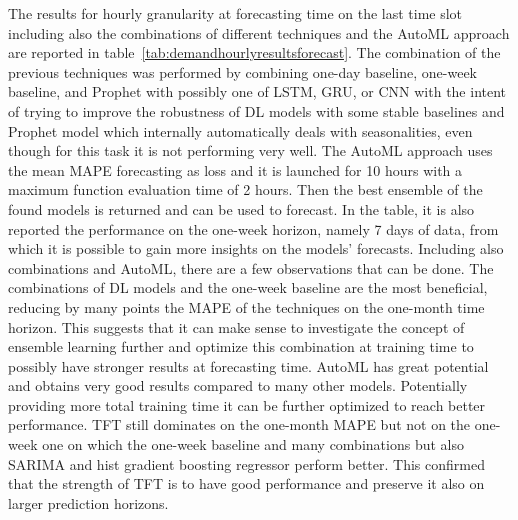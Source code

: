 The results for hourly granularity at forecasting time on the last time slot including also the combinations of different techniques and the AutoML approach are reported in table~\ref{tab:demandhourlyresultsforecast}.
The combination of the previous techniques was performed by combining one-day baseline, one-week baseline, and Prophet with possibly one of LSTM, GRU, or CNN with the intent of trying to improve the robustness of DL models with some stable baselines and Prophet model which internally automatically deals with seasonalities, even though for this task it is not performing very well.
The AutoML approach uses the mean MAPE forecasting as loss and it is launched for 10 hours with a maximum function evaluation time of 2 hours.
Then the best ensemble of the found models is returned and can be used to forecast.
In the table, it is also reported the performance on the one-week horizon, namely 7 days of data, from which it is possible to gain more insights on the models' forecasts.
Including also combinations and AutoML, there are a few observations that can be done.
The combinations of DL models and the one-week baseline are the most beneficial, reducing by many points the MAPE of the techniques on the one-month time horizon.
This suggests that it can make sense to investigate the concept of ensemble learning further and optimize this combination at training time to possibly have stronger results at forecasting time.
AutoML has great potential and obtains very good results compared to many other models.
Potentially providing more total training time it can be further optimized to reach better performance.
TFT still dominates on the one-month MAPE but not on the one-week one on which the one-week baseline and many combinations but also SARIMA and hist gradient boosting regressor perform better.
This confirmed that the strength of TFT is to have good performance and preserve it also on larger prediction horizons.

